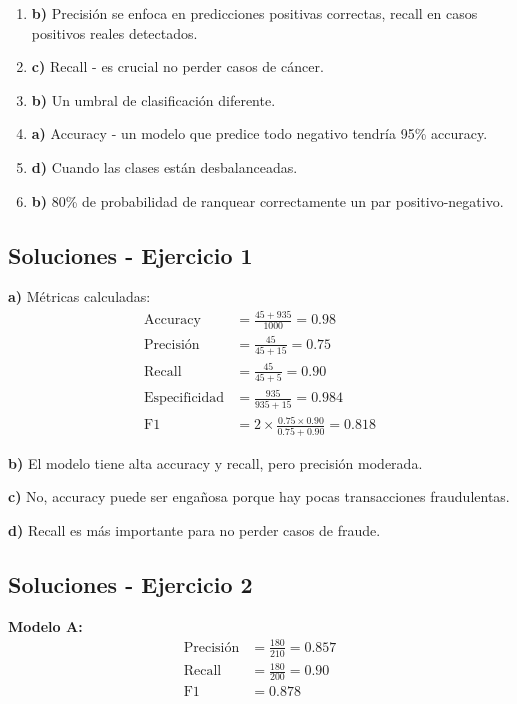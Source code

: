 \documentclass[12pt]{article}
\begin{document}
\begin{enumerate}
    \item \textbf{b)} Precisión se enfoca en predicciones positivas correctas, recall en casos positivos reales detectados.
    \item \textbf{c)} Recall - es crucial no perder casos de cáncer.
    \item \textbf{b)} Un umbral de clasificación diferente.
    \item \textbf{a)} Accuracy - un modelo que predice todo negativo tendría 95\% accuracy.
    \item \textbf{d)} Cuando las clases están desbalanceadas.
    \item \textbf{b)} 80\% de probabilidad de ranquear correctamente un par positivo-negativo.
\end{enumerate}

\subsection{Soluciones - Ejercicio 1}

\textbf{a)} Métricas calculadas:
\begin{align*}
\text{Accuracy} &= \frac{45 + 935}{1000} = 0.98 \\
\text{Precisión} &= \frac{45}{45 + 15} = 0.75 \\
\text{Recall} &= \frac{45}{45 + 5} = 0.90 \\
\text{Especificidad} &= \frac{935}{935 + 15} = 0.984 \\
\text{F1} &= 2 \times \frac{0.75 \times 0.90}{0.75 + 0.90} = 0.818
\end{align*}

\textbf{b)} El modelo tiene alta accuracy y recall, pero precisión moderada.

\textbf{c)} No, accuracy puede ser engañosa porque hay pocas transacciones fraudulentas.

\textbf{d)} Recall es más importante para no perder casos de fraude.

\subsection{Soluciones - Ejercicio 2}

\textbf{Modelo A:}
\begin{align*}
\text{Precisión} &= \frac{180}{210} = 0.857 \\
\text{Recall} &= \frac{180}{200} = 0.90 \\
\text{F1} &= 0.878
\end{align*}
\end{document}
